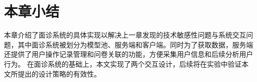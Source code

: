\section{本章小结}
本章介绍了面诊系统的具体实现以解决上一章发现的技术敏感性问题与系统交互问题，其中面诊系统被划分为模型池、服务端和客户端。同时为了获取数据，服务端还提供了用户操作记录管理和问卷关联的功能，方便采集用户信息和后续分析用户行为。
在面诊系统的基础上，本文实现了两个交互设计，后续将在实验中验证本文所提出的设计策略的有效性。